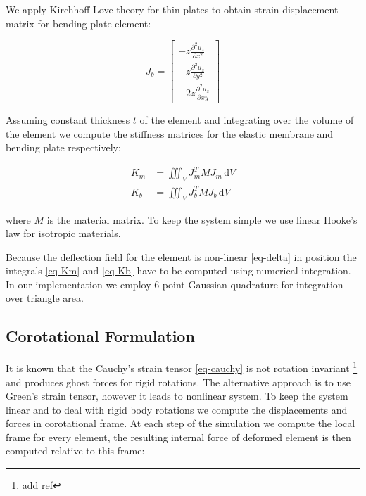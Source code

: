 \documentclass{egpubl}
\newcommand{\deriv}[2]{\frac{\partial #1}{\partial #2}}
\begin{document}
We apply Kirchhoff-Love theory for thin plates to obtain strain-displacement matrix for bending plate element:

\begin{equation}\label{eq-kirchhoff}
    J_b = \left[ \begin{matrix}
        - z \deriv{^2 u_z}{x^2} \\
        - z \deriv{^2 u_z}{y^2} \\
        - 2z \deriv{^2 u_z}{xy}
    \end{matrix} \right]
\end{equation}

Assuming constant thickness $t$ of the element and integrating over the volume
of the element we compute the stiffness matrices for the elastic membrane
and bending plate respectively:

\begin{align}
    \label{eq-Km}
    K_m & = \iiint_V J_m^T M J_m \, \mathrm{d} V \\
    \label{eq-Kb}
    K_b & = \iiint_V J_b^T M J_b \, \mathrm{d} V
\end{align}

\noindent
where $M$ is the material matrix. To keep the system simple we use linear
Hooke's law for isotropic materials.

Because the deflection field for the element is non-linear \eqref{eq-delta}
in position the integrals \eqref{eq-Km} and \eqref{eq-Kb} have to be computed using
numerical integration. In our implementation we employ 6-point Gaussian
quadrature for integration over triangle area.


\subsection{Corotational Formulation} %
\label{sec-corot}

It is known that the Cauchy's strain tensor \eqref{eq-cauchy} is not
rotation invariant \footnote{add ref} and produces ghost forces for rigid
rotations. The alternative approach is to use Green's strain tensor,
however it leads to nonlinear system. To keep the system linear and to deal
with rigid body rotations we compute the displacements and forces in
corotational frame. At each step of the simulation we compute the local
frame for every element, the resulting internal force of deformed element
is then computed relative to this frame:
\end{document}
